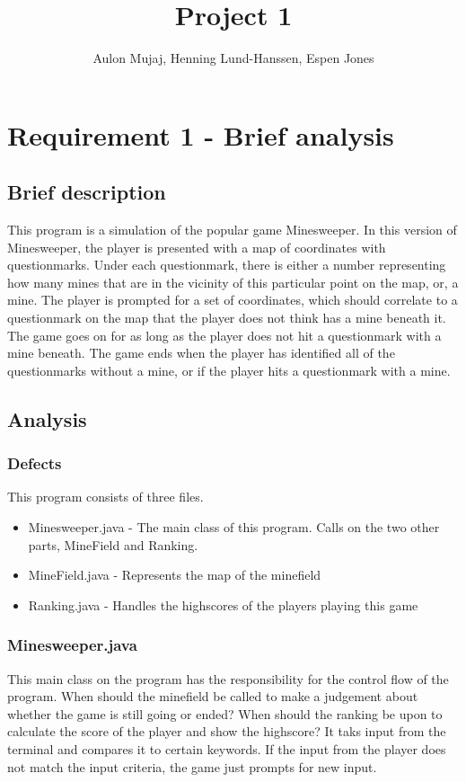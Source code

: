 \documentclass[UKenglish]{article}  %
\title{Project 1}        %
\author{Aulon Mujaj, Henning Lund-Hanssen, Espen Jones}                      %
\begin{document}
\maketitle{}

\section{Requirement 1 - Brief analysis}

\subsection{Brief description}
This program is a simulation of the popular game Minesweeper. In this version of
Minesweeper, the player is presented with a map of coordinates with
questionmarks. Under each questionmark, there is either a number representing
how many mines that are in the vicinity of this particular point on the map, or,
a mine. The player is prompted for a set of coordinates, which should correlate
to a questionmark on the map that the player does not think has a mine beneath
it. The game goes on for as long as the player does not hit a questionmark with
a mine beneath. The game ends when the player has identified all of the
questionmarks without a mine, or if the player hits a questionmark with a mine.
\subsection{Analysis}
\subsubsection{Defects}
This program consists of three files.

\begin{itemize}
    \item Minesweeper.java - The main class of this program. Calls on the two other parts, MineField and Ranking.
    \item MineField.java - Represents the map of the minefield
    \item Ranking.java - Handles the highscores of the players playing this game
\end{itemize}
\subsubsection{Minesweeper.java}
This main class on the program has the responsibility for the control flow of the program. When should the minefield be
called to make a judgement about whether the game is still going or ended? When should the ranking be upon to calculate
the score of the player and show the highscore? It taks input from the terminal and compares it to certain keywords. If
the input from the player does not match the input criteria, the game just prompts for new input.
\end{document}
